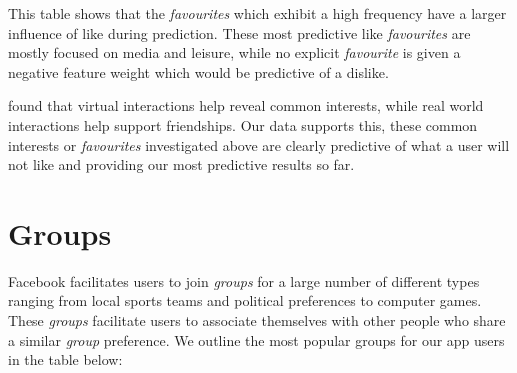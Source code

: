 This table shows that the \emph{favourites} which exhibit a high frequency have a larger influence of like during prediction. These most 
predictive like \emph{favourites} are mostly focused on media and leisure, while no explicit \emph{favourite} is given a negative feature 
weight which would be predictive of a dislike.

\cite{brandtzag2011facebook} found that virtual interactions help reveal common interests, while real world interactions help 
support friendships. Our data supports this, these common interests or \emph{favourites} investigated above are clearly predictive 
of what a user will not like and providing our most predictive results so far.


\section{Groups}
\label{sec:groups}

Facebook facilitates users to join \emph{groups} for a large number of different types ranging from 
local sports teams and political preferences to computer games. These \emph{groups} facilitate users to associate
themselves with other people who share a similar \emph{group} preference. We outline the most popular groups for our app users 
in the table below:


